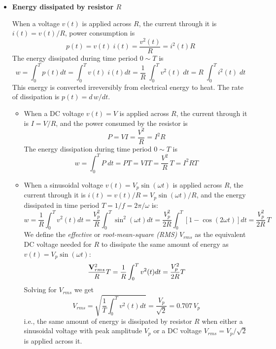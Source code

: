\documentclass{article}
\begin{document}
\begin{itemize}

\item {\bf Energy dissipated by resistor $R$}

  When a voltage $v(t)$ is applied across $R$, the current through it is
  $i(t)=v(t)/R$, power consumption is 
  \begin{equation} 
    p(t)=v(t)\;i(t)=\frac{v^2(t)}{R}=i^2(t)R 
  \end{equation}
  The energy dissipated during time period $0 \sim T$ is
  \begin{equation}
    w=\int_0^T p(t) dt=\int_0^T v(t)\; i(t) dt
    =\frac{1}{R}\;\int_0^T v^2(t)\; dt =R\;\int_0^T i^2(t)\; dt 
  \end{equation}
  This energy is converted irreversibly from electrical energy to heat. The 
  rate of dissipation is $p(t)=d\,w/dt$.

  \begin{itemize}
    \item When a DC voltage $v(t)=V$ is applied across $R$, the current 
      through it is $I=V/R$, and the power consumed by the resistor is 
      \begin{equation}
        P=VI=\frac{V^2}{R}=I^2R 
      \end{equation}
      The energy dissipation during time period $0\sim T$ is
      \begin{equation} 
        w=\int_0^T P\; dt=PT=VIT=\frac{V^2}{R}\,T=I^2RT 
      \end{equation}
    \item When a sinusoidal voltage $v(t)=V_p \sin(\omega t)$ is applied 
      across $R$, the current through it is $i(t)=v(t)/R=V_p\sin(\omega t)/R$, 
      and the energy dissipated in time period $T=1/f=2\pi/\omega$ is:
      \begin{equation}
        w=\frac{1}{R}\int_0^T v^2(t) dt
        =\frac{V_p^2}{R}\int_0^T \sin^2(\omega t) dt
        =\frac{V_p^2}{2R}\int_0^T [1-\cos(2\omega t)] dt=\frac{V_p^2}{2R}\,T
      \end{equation}
      We define the {\em effective} or {\em root-mean-square (RMS)} $V_{rms}$ 
      as the equivalent DC voltage needed for $R$ to dissipate the same amount 
      of energy as $v(t)=V_p \sin(\omega t)$:
      \begin{equation} 
        \frac{{\bf V}^2_{rms}}{R}T=\frac{1}{R}\int_0^T v^2(t)dt=\frac{V_p^2}{2R}T
      \end{equation}
      Solving for $V_{rms}$ we get
      \begin{equation} 
        V_{rms}=\sqrt{\frac{1}{T}\int_0^T v^2(t) dt }=\frac{V_p}{\sqrt{2}}=0.707\,V_p
      \end{equation}
      i.e., the same amount of energy is dissipated by resistor $R$ when 
      either a sinusoidal voltage with peak amplitude $V_p$ or a DC voltage 
      $V_{rms}=V_p/\sqrt{2}$ is applied across it.
   

\end{itemize}
\end{itemize}
\end{document}
